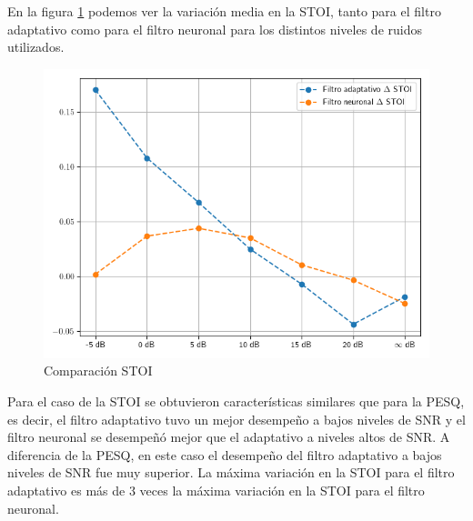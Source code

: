 En la figura \ref{fig:ch8_stoi_comparison} podemos ver la variación media en la STOI, tanto para el filtro adaptativo como para el filtro neuronal para los distintos niveles de ruidos utilizados.

\begin{figure}
	\centering
	\centerline{\includegraphics[scale=0.75]{images/ch8/comparison_stoi.png}}
	\caption{Comparación STOI}
	\label{fig:ch8_stoi_comparison}
\end{figure}

Para el caso de la STOI se obtuvieron características similares que para la PESQ, es decir, el filtro adaptativo tuvo un mejor desempeño a bajos niveles de SNR y el filtro neuronal se desempeñó mejor que el adaptativo a niveles altos de SNR. A diferencia de la PESQ, en este caso el desempeño del filtro adaptativo a bajos niveles de SNR fue muy superior. La máxima variación en la STOI para el filtro adaptativo es más de 3 veces la máxima variación en la STOI para el filtro neuronal.